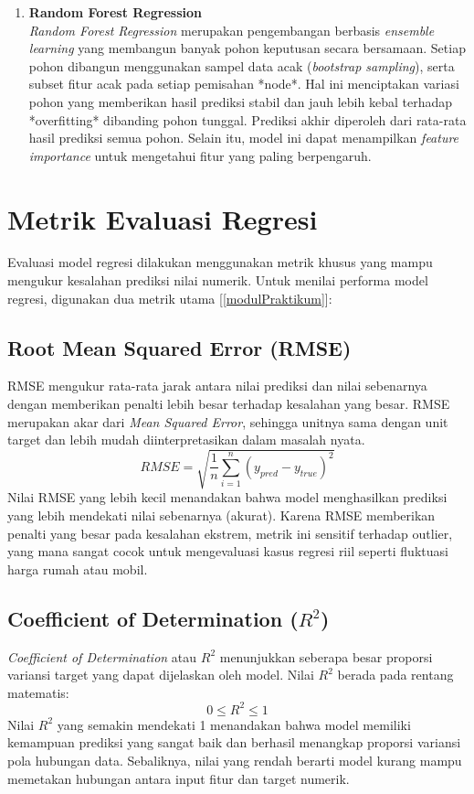 \documentclass[a4paper,oneside,11pt]{book}
\begin{document}
\begin{enumerate}
    \item \textbf{Random Forest Regression}\\
    \textit{Random Forest Regression} merupakan pengembangan berbasis \textit{ensemble learning} yang membangun banyak pohon keputusan secara bersamaan. Setiap pohon dibangun menggunakan sampel data acak (\textit{bootstrap sampling}), serta subset fitur acak pada setiap pemisahan *node*. Hal ini menciptakan variasi pohon yang memberikan hasil prediksi stabil dan jauh lebih kebal terhadap *overfitting* dibanding pohon tunggal. Prediksi akhir diperoleh dari rata-rata hasil prediksi semua pohon. Selain itu, model ini dapat menampilkan \textit{feature importance} untuk mengetahui fitur yang paling berpengaruh.
\end{enumerate}

\section{Metrik Evaluasi Regresi}
Evaluasi model regresi dilakukan menggunakan metrik khusus yang mampu mengukur kesalahan prediksi nilai numerik. Untuk menilai performa model regresi, digunakan dua metrik utama [\ref{modulPraktikum}]:

\subsection{Root Mean Squared Error (RMSE)}
RMSE mengukur rata-rata jarak antara nilai prediksi dan nilai sebenarnya dengan memberikan penalti lebih besar terhadap kesalahan yang besar. RMSE merupakan akar dari \textit{Mean Squared Error}, sehingga unitnya sama dengan unit target dan lebih mudah diinterpretasikan dalam masalah nyata. 
\begin{equation}
    RMSE = \sqrt{\frac{1}{n}\sum_{i=1}^{n}(y_{pred} - y_{true})^2}
\end{equation}
Nilai RMSE yang lebih kecil menandakan bahwa model menghasilkan prediksi yang lebih mendekati nilai sebenarnya (akurat). Karena RMSE memberikan penalti yang besar pada kesalahan ekstrem, metrik ini sensitif terhadap outlier, yang mana sangat cocok untuk mengevaluasi kasus regresi riil seperti fluktuasi harga rumah atau mobil.

\subsection{Coefficient of Determination ($R^2$)}
\textit{Coefficient of Determination} atau $R^2$ menunjukkan seberapa besar proporsi variansi target yang dapat dijelaskan oleh model. Nilai $R^2$ berada pada rentang matematis:
\begin{equation}
    0 \le R^2 \le 1
\end{equation}
Nilai $R^2$ yang semakin mendekati 1 menandakan bahwa model memiliki kemampuan prediksi yang sangat baik dan berhasil menangkap proporsi variansi pola hubungan data. Sebaliknya, nilai yang rendah berarti model kurang mampu memetakan hubungan antara input fitur dan target numerik.
\end{document}
